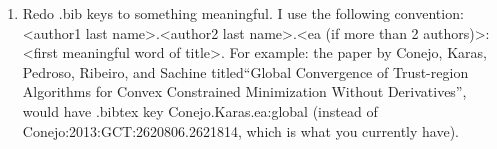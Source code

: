 \documentclass[11pt,letterpaper]{thesis2}
\begin{document}
\begin{enumerate}
\item Redo .bib keys to something meaningful.   I use the following convention:   <author1 last name>.<author2 last name>.<ea (if more than 2 authors)>:<first meaningful word of title>.  For example:
the paper by   Conejo, Karas, Pedroso, Ribeiro, and Sachine titled``Global Convergence of Trust-region Algorithms for Convex Constrained Minimization Without Derivatives'', would have .bibtex key
Conejo.Karas.ea:global  (instead of Conejo:2013:GCT:2620806.2621814, which is what you currently have).
\end{enumerate}
\end{document}
